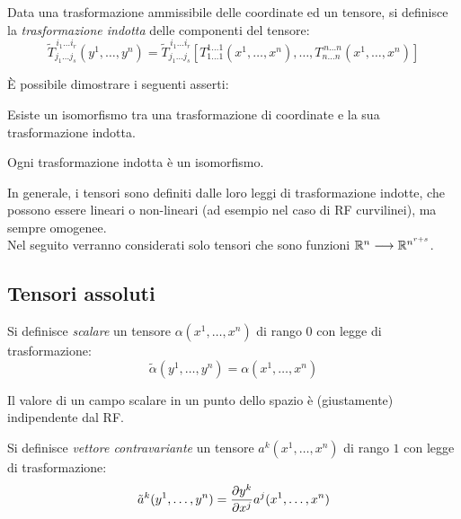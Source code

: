 \begin{definition}
	Data una trasformazione ammissibile delle coordinate ed un tensore, si definisce la \textit{trasformazione indotta} delle componenti del tensore:
	\begin{equation}
		\tilde{T}^{\,i_1 \dots i_r}_{j_1 \dots j_s} (y^1, \dots, y^n) = \tilde{T}^{\,i_1 \dots i_r}_{j_1 \dots j_s} \left[ T^{1 \dots 1}_{1 \dots 1} (x^1, \dots, x^n), \dots, T^{\,n \dots n}_{n \dots n} (x^1, \dots, x^n) \right]
		\label{eq:2}
	\end{equation}
\end{definition}

È possibile dimostrare i seguenti asserti:

\begin{theorem}
	Esiste un \textnormal{isomorfismo} tra una trasformazione di coordinate e la sua trasformazione indotta.
\end{theorem}

\begin{proposition}
	Ogni trasformazione indotta è un isomorfismo.
\end{proposition}

In generale, i tensori sono definiti dalle loro leggi di trasformazione indotte, che possono essere lineari o non-lineari (ad esempio nel caso di RF curvilinei), ma sempre omogenee. \\
Nel seguito verranno considerati solo tensori che sono funzioni $ \mathbb{R}^n \longrightarrow \mathbb{R}^{n^{r+s}} $.


\subsection{Tensori assoluti}


\begin{definition}
	Si definisce \textit{scalare} un tensore $ \alpha (x^1, \dots, x^n) $ di rango $ 0 $ con legge di trasformazione:
	\begin{equation}
		\tilde{\alpha} (y^1, \dots, y^n) = \alpha (x^1, \dots, x^n)
		\label{eq:3}
	\end{equation}
\end{definition}

Il valore di un campo scalare in un punto dello spazio è (giustamente) indipendente dal RF.

\begin{definition}
	Si definisce \textit{vettore contravariante} un tensore $ a^k (x^1, \dots, x^n) $ di rango $ 1 $ con legge di trasformazione:
	\begin{equation}
		\tilde{a}^k (y^1, \dots, y^n) = \frac{\partial y^k}{\partial x^j} a^j (x^1, \dots, x^n)
		\label{eq:4}
	\end{equation}
\end{definition}

